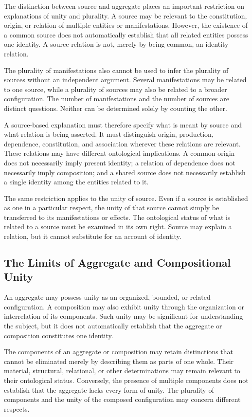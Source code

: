 The distinction between source and aggregate places
an important restriction on explanations of unity
and plurality. A source may be relevant to the
constitution, origin, or relation of multiple entities
or manifestations. However, the existence of a common
source does not automatically establish that all
related entities possess one identity. A source
relation is not, merely by being common, an identity
relation.

The plurality of manifestations also cannot be used
to infer the plurality of sources without an
independent argument. Several manifestations may
be related to one source, while a plurality of
sources may also be related to a broader configuration.
The number of manifestations and the number of
sources are distinct questions. Neither can be
determined solely by counting the other.

A source-based explanation must therefore specify
what is meant by source and what relation is being
asserted. It must distinguish origin, production,
dependence, constitution, and association wherever
these relations are relevant. These relations may
have different ontological implications. A common
origin does not necessarily imply present identity;
a relation of dependence does not necessarily imply
composition; and a shared source does not necessarily
establish a single identity among the entities
related to it.

The same restriction applies to the unity of source.
Even if a source is established as one in a particular
respect, the unity of that source cannot simply be
transferred to its manifestations or effects. The
ontological status of what is related to a source
must be examined in its own right. Source may explain
a relation, but it cannot substitute for an account
of identity.

\subsection{The Limits of Aggregate and Compositional Unity}

An aggregate may possess unity as an organized,
bounded, or related configuration. A composition
may also exhibit unity through the organization
or interrelation of its components. Such unity
may be significant for understanding the subject,
but it does not automatically establish that the
aggregate or composition constitutes one identity.

The components of an aggregate or composition may
retain distinctions that cannot be eliminated
merely by describing them as parts of one whole.
Their material, structural, relational, or other
determinations may remain relevant to their
ontological status. Conversely, the presence of
multiple components does not establish that the
aggregate lacks every form of unity. The plurality
of components and the unity of the composed
configuration may concern different respects.

